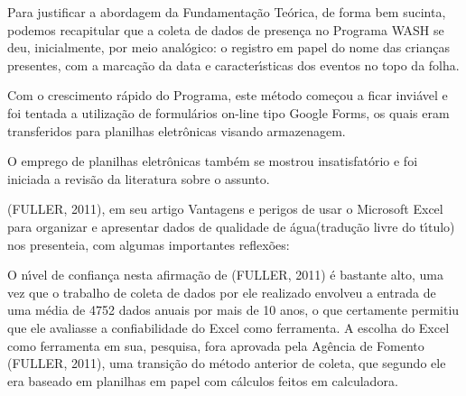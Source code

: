\documentclass[
12pt,		%
openright,	%
twoside,  %
a4paper,			%
chapter=TITLE,		%
english,			%
french,				%
spanish,			%
brazil				%
]{USPSC-classe/USPSC}
\begin{document}
Para justificar a abordagem da Fundamenta\c{c}\~ao Te\'orica, de forma bem sucinta, podemos recapitular que a coleta de dados de presen\c{c}a no  Programa WASH se deu, inicialmente, por meio anal\'ogico: o registro em papel do nome das crian\c{c}as presentes, com a marca\c{c}\~ao da data e caracter\'{\i}sticas dos eventos no topo da folha.









Com o crescimento r\'apido do Programa, este m\'etodo come\c{c}ou a ficar invi\'avel e foi tentada a utiliza\c{c}\~ao de formul\'arios on-line tipo \textquotedbl Google Forms\textquotedbl , os quais eram transferidos para planilhas eletr\^onicas visando armazenagem.









O emprego de planilhas eletr\^onicas tamb\'em se mostrou insatisfat\'orio e foi iniciada a revis\~ao da literatura sobre o assunto.









(FULLER, 2011), em seu artigo \textquotedbl Vantagens e perigos de usar o Microsoft Excel para organizar e apresentar dados de qualidade de \'agua\textquotedbl  (tradu\c{c}\~ao livre do t\'{\i}tulo) nos presenteia, com algumas importantes reflex\~oes:










\noindent\begin{center}\mbox{\centering{}}\end{center}


O n\'{\i}vel de confian\c{c}a nesta afirma\c{c}\~ao de (FULLER, 2011) \'e bastante alto, uma vez que o trabalho de coleta de dados por ele realizado envolveu a entrada de uma m\'edia de 4752 dados anuais por mais de 10 anos, o que certamente permitiu que ele avaliasse a confiabilidade do Excel como ferramenta. A escolha do Excel como ferramenta em sua, pesquisa, fora aprovada pela Ag\^encia de Fomento  (FULLER, 2011), uma transi\c{c}\~ao do m\'etodo anterior de coleta, que segundo ele era baseado em planilhas em papel com c\'alculos feitos em calculadora.
\end{document}
